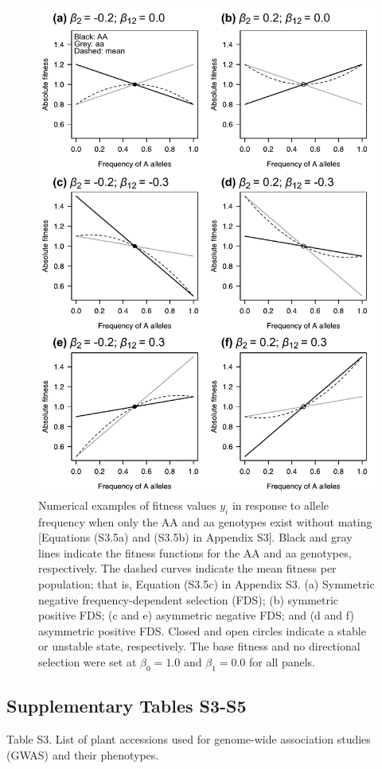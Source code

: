 \documentclass[12pt,]{article}
\begin{document}
\begin{figure}[]
  \includegraphics[width=0.75\linewidth]{FigS3_AsymFDSinbred.pdf}
  \caption{Numerical examples of fitness values $y_i$ in response to allele frequency when only the AA and aa genotypes exist without mating [Equations (S3.5a) and (S3.5b) in Appendix S3]. Black and gray lines indicate the fitness functions for the AA and aa genotypes, respectively. The dashed curves indicate the mean fitness per population; that is, Equation (S3.5c) in Appendix S3. (a) Symmetric negative frequency-dependent selection (FDS); (b) symmetric positive FDS; (c and e) asymmetric negative FDS; and (d and f) asymmetric positive FDS. Closed and open circles indicate a stable or unstable state, respectively. The base fitness and no directional selection were set at $\beta_0=1.0$ and $\beta_1=0.0$ for all panels.}
  \label{figS3:FDSinbred}
\end{figure}

\newpage
\subsection*{Supplementary Tables S3-S5}

\medskip
\noindent
Table S3. List of plant accessions used for genome-wide association studies (GWAS) and their phenotypes.
\end{document}
